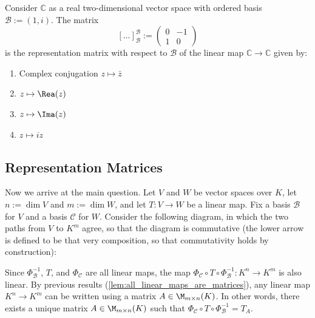 \begin{exercise}
\label{exc:complex_multiplication_real_linear_map_sc}
Consider $\mathbb{C}$ as a real two-dimensional vector space with ordered basis $\mathcal{B} := (1, i)$. The matrix
\[
[\dots]_{\mathcal{B}}^{\mathcal{B}} := \begin{pmatrix} 0 & -1 \\ 1 & 0 \end{pmatrix}
\]
is the representation matrix with respect to $\mathcal{B}$ of the linear map $\mathbb{C} \to \mathbb{C}$ given by:
\begin{enumerate}
    \item Complex conjugation $z \mapsto \bar{z}$
    \item $z \mapsto \Rea(z)$
    \item $z \mapsto \Ima(z)$
    \item $z \mapsto iz$
\end{enumerate}
\end{exercise}

\subsection{Representation Matrices}

Now we arrive at the main question. Let $V$ and $W$ be vector spaces over $K$, let $n := \dim V$ and $m := \dim W$, and let $T: V \to W$ be a linear map. Fix a basis $\mathcal{B}$ for $V$ and a basis $\mathcal{C}$ for $W$. Consider the following diagram, in which the two paths from $V$ to $K^m$ agree, so that the diagram is commutative (the lower arrow is defined to be that very composition, so that commutativity holds by construction):
\begin{center}
\end{center}
Since $\Phi_{\mathcal{B}}^{-1}$, $T$, and $\Phi_{\mathcal{C}}$ are all linear maps, the map $\Phi_{\mathcal{C}} \circ T \circ \Phi_{\mathcal{B}}^{-1}: K^n \to K^m$ is also linear. By previous results (\cref{lem:all_linear_maps_are_matrices}), any linear map $K^n \to K^m$ can be written using a matrix $A \in \M_{m \times n}(K)$. In other words, there exists a unique matrix $A \in \M_{m \times n}(K)$ such that $\Phi_{\mathcal{C}} \circ T \circ \Phi_{\mathcal{B}}^{-1} = T_A$.

